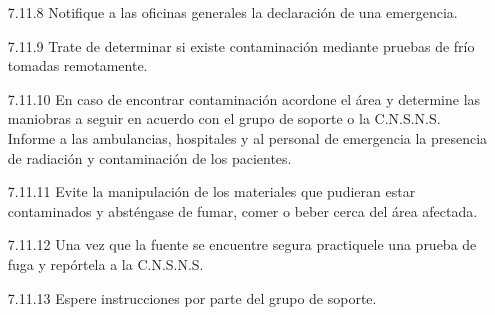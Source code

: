 \begin{itemize}
    \item[7.11.8] Notifique a las oficinas generales la declaración de una emergencia.
    \item[7.11.9] Trate de determinar si existe contaminación mediante pruebas de frío tomadas remotamente.
    \item[7.11.10] En caso de encontrar contaminación acordone el área y determine las maniobras a seguir en acuerdo con el grupo de soporte o la C.N.S.N.S. Informe a las ambulancias, hospitales y al personal de emergencia la presencia de radiación y contaminación de los pacientes.
    \item[7.11.11] Evite la manipulación de los materiales que pudieran estar contaminados y absténgase de fumar, comer o beber cerca del área afectada.
    \item[7.11.12] Una vez que la fuente se encuentre segura practiquele una prueba de fuga y repórtela a la C.N.S.N.S.
    \item[7.11.13] Espere instrucciones por parte del grupo de soporte.
\end{itemize}
